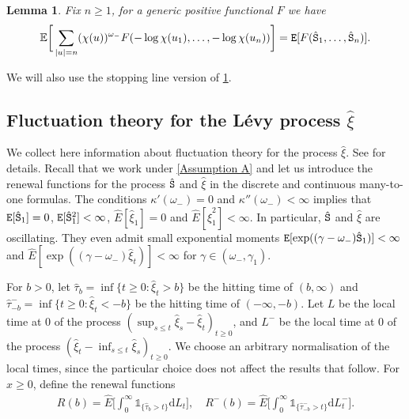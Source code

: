 \documentclass[12pt]{article}
\numberwithin{equation}{section}
\theoremstyle{plain}
\newtheorem{lem}[thm]{Lemma}
\theoremstyle{definition}
\newcommand{\D}{\mathrm{d}}
\begin{document}
\begin{lem}\label{lem: many-to-one}
Fix $n \geq 1$, for a generic positive functional $F$ we have
\begin{equation}\label{eq: many-to-one}
\mathbb{E}\bigg[\sum_{|u|=n} (\chi(u))^{\omega_-}F(-\log\chi(u_1), \ldots, -\log\chi(u_n))\bigg] = {\tt E}[F({\hat{\tt S}}_1, \ldots, {\hat{\tt S}}_n)].
\end{equation}
\end{lem}

We will also use the stopping line version of \cref{lem: many-to-one}.

\subsection{Fluctuation theory for the L\'evy process $\hat{\xi}$}
\label{sec: fluctuations}
We collect here information about fluctuation theory for the process $\hat{\xi}$. See \cite{bertoin1996levy} for details.  Recall that we work under \cref{Assumption A} and let us introduce the renewal functions for the process ${\hat{\tt S}}$ and $\hat{\xi}$ in the discrete and continuous many-to-one formulas. The conditions $\kappa'(\omega_-) = 0$ and $\kappa''(\omega_-) < \infty$ implies that ${\tt E}[{\hat{\tt S}}_1] = 0$, ${\tt E}[{\hat{\tt S}}^2_1] < \infty$, $\hat{E}[\hat{\xi}_1] = 0$ and $\hat{E}[\hat{\xi}^2_1]<\infty$.  In particular, ${\hat{\tt S}}$ and $\hat{\xi}$ are oscillating. They even admit small exponential moments $ {\tt E}[\exp((\gamma-\omega_-){\hat{\tt S}}_1)]< \infty$ and  ${\hat E}[\exp((\gamma-\omega_-)\hat{\xi}_t)]< \infty$ for  $\gamma\in (\omega_-,\gamma_1)$.



For $b > 0$, let $\hat{\tau}_b = \inf\{t\geq 0: \hat{\xi}_t>b\}$ be the hitting time of $(b, \infty)$ and $\hat{\tau}_{-b}^- = \inf\{t\geq 0: \hat{\xi}_t<-b\}$ be the hitting time of $(-\infty, -b)$. Let $L$ be the local time at $0$ of the process $(\sup_{s\leq t} \hat{\xi}_s - \hat{\xi}_t)_{t\geq 0}$, and $L^-$ be the local time at $0$ of the process $(\hat{\xi}_t-\inf_{s\leq t} \hat{\xi}_s)_{t\geq 0}$. We choose an arbitrary normalisation of the local times, since the particular choice does not affect the results that follow. For $x\geq 0$, define the renewal functions
\begin{align}\label{eq: def R levy}
    R(b) = \hat{E}\bigg[\int^{\infty}_{0} \mathds{1}_{\{\hat{\tau}_b > t\}}\mathrm{d}L_t\bigg], \quad R^-(b) = \hat{E}\bigg[\int^{\infty}_{0}\mathds{1}_{\{\hat{\tau}^-_{-b} > t\}}\D L^-_t\bigg].
\end{align}
\end{document}
